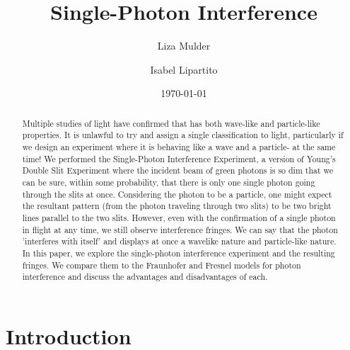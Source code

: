 \documentclass[prb,preprint]{revtex4-1}
\begin{document}

\title{Single-Photon Interference}


\author{Liza Mulder}


\author{Isabel Lipartito}


\date{\today}


\begin{abstract}

Multiple studies of light have confirmed that has both wave-like and particle-like properties.  It is unlawful to try and assign a single classification to light, particularly if we design an experiment where it is behaving like a wave and a particle- at the same time!  We performed the Single-Photon Interference Experiment, a version of Young's Double Slit Experiment where the incident beam of green photons is so dim that we can be sure, within some probability, that there is only one single photon going through the slits at once.  Considering the photon to be a particle, one might expect the resultant pattern (from the photon traveling through two slits) to be two bright lines parallel to the two slits.  However, even with the confirmation of a single photon in flight at any time, we still observe interference fringes.  We can say that the photon 'interferes with itself' and displays at once a wavelike nature and particle-like nature.  In this paper, we explore the single-photon interference experiment and the resulting fringes.  We compare them to the Fraunhofer and Fresnel models for photon interference and discuss the advantages and disadvantages of each.


\end{abstract}

\maketitle %


\section{Introduction} %
\end{document}
